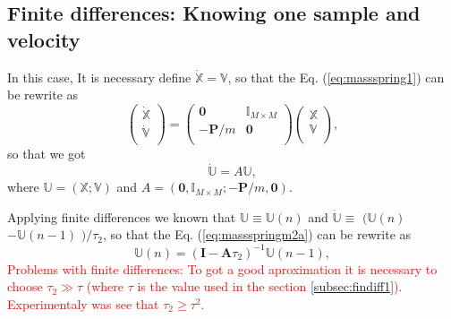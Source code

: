 \documentclass[review]{elsarticle}
\begin{document}
\subsection{Finite differences: Knowing one sample and velocity}
In this case, It is necessary define $\mathbb{\dot{X}} = \mathbb{V}$, so that
the Eq. (\ref{eq:massspring1}) can be rewrite as
\begin{equation}\label{eq:massspringm2}
\left(
\begin{matrix}
 \mathbb{\dot{X}}\\
 \mathbb{\dot{V}}\\
\end{matrix}\right)=
\left(
\begin{matrix}
 \mathbf{0}    & \mathbb{I}_{M \times M} \\
 -\mathbf{P}/m & \mathbf{0} \\
\end{matrix}\right)
\left(
\begin{matrix}
 \mathbb{X}\\
 \mathbb{V}\\
\end{matrix}\right),
\end{equation}
so that we got
\begin{equation}\label{eq:massspringm2a}
 \mathbb{\dot{U}}=A\mathbb{U},
\end{equation}
where $\mathbb{U}= \left( \mathbb{X} ; \mathbb{V} \right)$ and
$A=\left( \mathbf{0} , \mathbb{I}_{M \times M} ; -\mathbf{P}/m , \mathbf{0} \right)$.

Applying finite differences we known that $\mathbb{U} \equiv \mathbb{U}(n)$ and
$\mathbb{\dot{U}} \equiv$ $( \mathbb{U}(n)$ $-\mathbb{U}(n-1)$ $ ) /{\tau_2}$, 
so that the Eq. (\ref{eq:massspringm2a}) can be rewrite as
\begin{equation}\label{eq:massspring2m2}
 \mathbb{U}(n) = \left( \mathbf{I} -\mathbf{A}\tau_2 \right)^{-1} \mathbb{U}(n-1),
\end{equation}
\textcolor{red}{Problems  with finite differences: To got a good aproximation it 
is necessary to choose $\tau_2 \gg \tau$ (where $\tau$ is the value used in the section \ref{subsec:findiff1}). Experimentaly was see that $\tau_2 \geq \tau^2$.}
\end{document}
